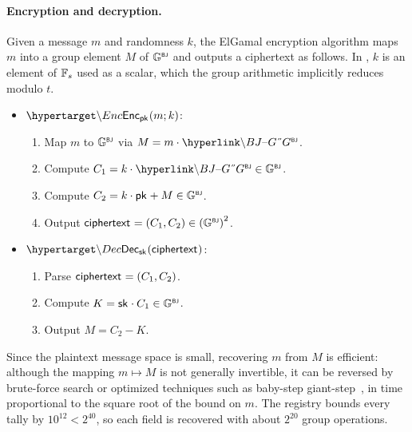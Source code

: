 \paragraph{Encryption and decryption.}
Given a message $m$ and randomness $k$, the ElGamal encryption algorithm maps $m$ into a group element $M$ of ${\mathbb{G}}^{\text{\tiny \sf BJ}}$ and outputs a ciphertext as follows. In \davinci, $k$ is an element of $\mathbb{F}_s$ used as a scalar, which the group arithmetic implicitly reduces modulo $t$.
%
\begin{mdframed}
	\begin{minipage}[t]{0.54\textwidth}
		\begin{itemize}
			\item[$\bullet$] $\hlset{\Enc}_{\pk}(m; k)$:
			\begin{enumerate}
				\item Map $m$ to ${\mathbb{G}}^{\text{\tiny \sf BJ}}$ via $M = m \cdot \hlget{\BJ{G}}$.
				\item Compute $C_1 = k \cdot \hlget{\BJ{G}} \in \BJ{\G}$.
				\item Compute $C_2 = k \cdot {\sf{pk}^{}} + M \in {\mathbb{G}}^{\text{\tiny \sf BJ}}$.
				\item Output ${\sf{ciphertext}^{}} = (C_1, C_2) \in {({\mathbb{G}}^{\text{\tiny \sf BJ}})}^2$.
			\end{enumerate}
		\end{itemize}
	\end{minipage}
	\begin{minipage}[t]{0.44\textwidth}
		\begin{itemize}
			\item[$\bullet$] $\hlset{\Dec}_{\sk}(\enc)$:
			\begin{enumerate}
				\item Parse ${\sf{ciphertext}^{}} = (C_1, C_2)$.
				\item Compute $K = {\sf{sk}^{}} \cdot C_1 \in {\mathbb{G}}^{\text{\tiny \sf BJ}}$.
				\item Output $M = C_2 - K$.
			\end{enumerate}
		\end{itemize}
	\end{minipage}
\end{mdframed}

Since the plaintext message space is small, recovering $m$ from $M$ is efficient: although the mapping $m \mapsto M$ is not generally invertible, it can be reversed by brute-force search or optimized techniques such as baby-step giant-step~\cite{blake1995elliptic}, in time proportional to the square root of the bound on $m$. The registry bounds every tally by $10^{12} < 2^{40}$, so each field is recovered with about $2^{20}$ group operations.

